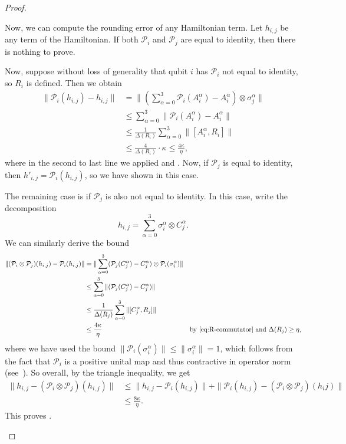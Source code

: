 \documentclass[11pt]{article}
\theoremstyle{plain}
\renewcommand{\cP}{\mathcal{P}}
\begin{document}
\begin{proof}
\begin{enumerate}
Now, we can compute the rounding error of any Hamiltonian term. Let $h_{i,j}$ be any term of the Hamiltonian. If both $\cP_i$ and $\cP_j$ are equal to identity, then there is nothing to prove.

Now, suppose without loss of generality that qubit $i$ has $\cP_i$ not equal to identity, so $R_i$ is defined. Then we obtain
\begin{align}
    \| \cP_i(h_{i,j}) - h_{i,j} \| &= \| (\sum_{\alpha =0}^3 \cP_i(A_i^\alpha)  - A_i^\alpha) \otimes \sigma_j^\alpha \| \\
    &\leq \sum_{\alpha =0}^3 \| \cP_i(A_i^\alpha) - A_i^\alpha\| \\
    &\leq  \frac{1}{\Delta(R_i)} \sum_{\alpha =0}^3 \|[A_i^\alpha, R_i] \| \\
    &\leq \frac{4}{\Delta(R_i)} \cdot \kappa \leq \frac{4 \kappa}{\eta},
 \end{align}
 where in the second to last line we applied  and . Now, if $\cP_j$ is equal to identity, then $h'_{i,j} = \cP_i(h_{i,j})$, so we have shown  in this case.

The remaining case is if $\cP_j$ is also not equal to identity. In this case, write the decomposition
\[ h_{i,j} = \sum_{\alpha=0}^{3} \sigma_i^\alpha \otimes C_j^\alpha. \]
We can similarly derive the bound
\begin{align}
    \| (\cP_i \otimes \cP_j)(h_{i,j}) - \cP_i(h_{i,j}) \| &= \| \sum_{\alpha =0}^3 (\cP_j(C_j^\alpha) - C_j^\alpha) \otimes \cP_i(\sigma_i^\alpha) \| \\
    &\leq  \sum_{\alpha =0}^3 \| (\cP_j(C_j^\alpha) - C_j^\alpha) \| \\
    &\leq \frac{1}{\Delta(R_j)} \sum_{\alpha =0}^3 \| [C_j^\alpha, R_j] \| \\
    &\leq \frac{4\kappa}{\eta} & \text{by \Cref{eq:R-commutator} and } \Delta(R_j) \geq \eta,
\end{align}
where we have used the bound $\| \cP_i(\sigma_i^\alpha) \| \leq \| \sigma_i^\alpha \| = 1$, which follows from the fact that $\cP_i$ is a positive unital map and thus contractive in operator norm (see~\cite[Theorem~6.12]{Watrous_2018}). 
So overall, by the triangle inequality, we get
\begin{align}
    \| h_{i,j} - (\cP_i \otimes \cP_j)(h_{i,j})  \| &\leq \| h_{i,j} - \cP_i(h_{i,j}) \| + \| \cP_i(h_{i,j}) - (\cP_i \otimes \cP_j)(h_ij) \| \\
    &\leq \frac{8\kappa}{\eta}. 
\end{align}
This proves .
\end{enumerate}
\end{proof}
\end{document}

